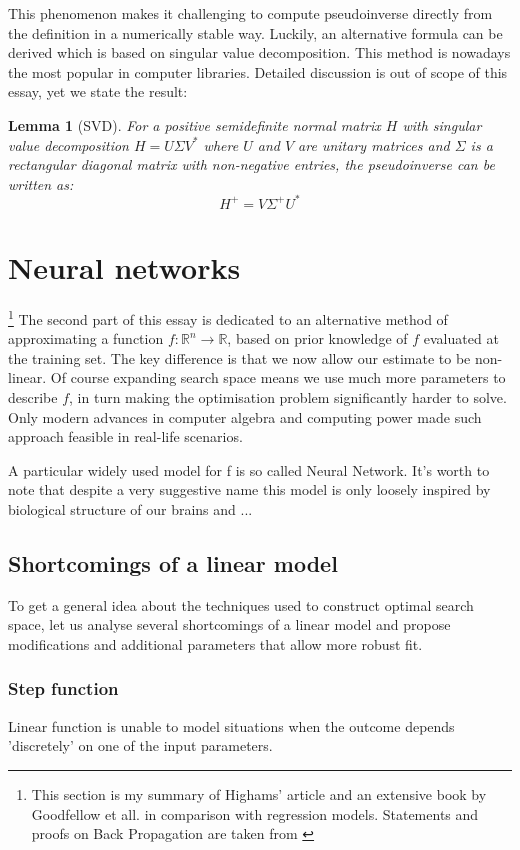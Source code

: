 \documentclass[a4paper]{article}
\theoremstyle{break}
\newtheorem{lemma}[theorem]{Lemma}
\newcommand{\R}{\mathbb{R}}
\begin{document}
This phenomenon makes it challenging to compute pseudoinverse directly from the definition in a numerically stable way. Luckily, an alternative formula can be derived which is based on singular value decomposition. This method is nowadays the most popular in computer libraries. Detailed discussion is out of scope of this essay, yet we state the result:
\begin{lemma}[SVD]
    For a positive semidefinite normal matrix $H$ with singular value decomposition $H = U \Sigma V^*$ where $U$ and $V$ are unitary matrices and $\Sigma$ is a rectangular diagonal matrix with non-negative entries, the pseudoinverse can be written as:
    $$ H^+ = V \Sigma^+ U^* $$
\end{lemma}

\pagebreak

\section{Neural networks}

\footnote{This section is my summary of Highams' article \cite{higham} and an extensive book by Goodfellow et all. \cite{goodfellow} in comparison with regression models. Statements and proofs on Back Propagation are taken from \cite{higham}}
%
The second part of this essay is dedicated to an alternative method of approximating a function $ f : \R^n \to \R$, based on prior knowledge of $f$ evaluated at the training set. The key difference is that we now allow our estimate to be non-linear. Of course expanding search space means we use much more parameters to describe $f$, in turn making the optimisation problem significantly harder to solve. Only modern advances in computer algebra and computing power made such approach feasible in real-life scenarios.

A particular widely used model for f is so called Neural Network. It's worth to note that despite a very suggestive name this model is only loosely inspired by biological structure of our brains and ...

\subsection{Shortcomings of a linear model}
To get a general idea about the techniques used to construct optimal search space, let us analyse several shortcomings of a linear model and propose modifications and additional parameters that allow more robust fit.

\subsubsection{Step function}
Linear function is unable to model situations when the outcome depends 'discretely' on one of the input parameters.
\end{document}
